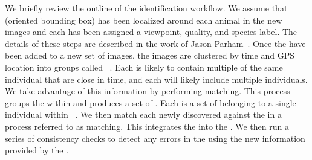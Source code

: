     We briefly review the outline of the identification workflow.
    We assume that \aan{\annot{}} (oriented bounding box) has been localized
      around each animal in the new images and each \annot{} has been assigned a
      viewpoint, quality, and species label.
    The details of these steps are described in the work of Jason
      Parham~\cite{parham_photographic_2015}.
    Once the \annots{} have been added to a new set of images, the images are
      clustered by time and GPS location into groups called
      \glossterm{\occurrences{}}~\cite{wieczorek_darwin_2012}.
    Each \occurrence{} is likely to contain multiple \annots{} of the same
      individual that are close in time, and each \occurrence{} will likely
      include multiple individuals.
    We take advantage of this information by performing
      \glossterm{\intraoccurrence{}} matching.
    This process groups the \annots{} within \aan{\occurrence{}} and produces
      a set of \encounters{}.
    Each \glossterm{\encounter{}} is a set of \annots{} belonging to a single
      individual within \aan{\occurrence{}}~\cite{j_bonner_mark_recapture_2013}.
    We then match each newly discovered \encounter{} against the
      \masterdatabase{} in a process referred to as \glossterm{\vsexemplar{}}
      matching.
    This integrates the \occurrence{} into the \masterdatabase{}.
    We then run a series of consistency checks to detect any errors in the
      \masterdatabase{} using the new information provided by the \occurrence{}.

